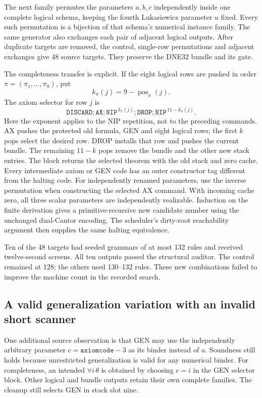 The next family permutes the parameters $a,b,c$ independently inside
one complete logical schema, keeping the fourth Lukasiewicz parameter
$u$ fixed. Every such permutation is a bijection of that schema's
numerical instance family. The same generator also exchanges each pair
of adjacent logical outputs. After duplicate targets are removed, the
control, single-row permutations and adjacent exchanges give 48 source
targets. They preserve the DNE32 bundle and its gate.

The completeness transfer is explicit. If the eight logical rows are
pushed in order $\pi=(\pi_1,\ldots,\pi_8)$, put
\[
 k_\pi(j)=9-\operatorname{pos}_\pi(j).
\]
The axiom selector for row $j$ is
\[
 \mathtt{DISCARD;AX;}\mathtt{NIP}^{\,k_\pi(j)}
 \mathtt{;DROP;}\mathtt{NIP}^{\,11-k_\pi(j)}.
\]
Here the exponent applies to the NIP repetition, not to the preceding
commands. AX pushes the protected old formula, GEN and eight logical
rows; the first $k$ pops select the desired row. DROP installs that row
and pushes the current bundle. The remaining $11-k$ pops remove the
bundle and the other new stack entries. The block returns the selected
theorem with the old stack and zero cache. Every intermediate axiom or
GEN code has an outer constructor tag different from the halting code.
For independently renamed parameters, use the inverse permutation when
constructing the selected AX command. With incoming cache zero, all
three scalar parameters are independently realizable. Induction on the
finite derivation gives a primitive-recursive new candidate number
using the unchanged dual-Cantor encoding. The scheduler's dirty-root
reachability argument then supplies the same halting equivalence.

Ten of the 48 targets had seeded grammars of at most 132 rules and
received twelve-second screens. All ten outputs passed the structural
auditor. The control remained at 128; the others used 130--132 rules.
These new combinations failed to improve the machine count in the
recorded search.

\subsection{A valid generalization variation with an invalid short scanner}

One additional source observation is that GEN may use the independently
arbitrary parameter $c=\mathtt{axiomcode}-3$ as its binder instead of
$a$. Soundness still holds because unrestricted generalization is valid
for any numerical binder. For completeness, an intended
$\forall i\,\theta$ is obtained by choosing $c=i$ in the GEN selector
block. Other logical and bundle outputs retain their own complete
families. The cleanup still selects GEN in stack slot nine.

